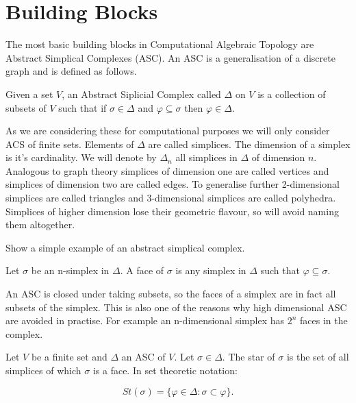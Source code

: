 \section{Building Blocks}

The most basic building blocks in Computational Algebraic Topology are Abstract Simplical Complexes (ASC). An ASC is a generalisation of a discrete graph and is defined as follows.


\begin{defn} Given a set $V$, an Abstract Siplicial Complex called $\Delta$ on $V$ is a collection of subsets of $V$ such that if $\sigma \in \Delta$ and $\varphi \subseteq \sigma$ then $\varphi \in \Delta$.  \end{defn}

As we are considering these for computational purposes we will only consider ACS of finite sets. Elements of $\Delta$ are called simplices. The dimension of a simplex is it's cardinality. We will denote by $\Delta_n$ all simplices in $\Delta$ of dimension $n$. Analogous to graph theory simplices of dimension one are called vertices and simplices of dimension two are called edges. To generalise further 2-dimensional simplices are called triangles and 3-dimensional simplices are called polyhedra. Simplices of higher dimension lose their geometric flavour, so will avoid naming them altogether.

\begin{ex} Show a simple example of an abstract simplical complex. \end{ex}


\begin{defn} Let $\sigma$ be an n-simplex in $\Delta$. A face of $\sigma$ is any simplex in $\Delta$ such that $\varphi \subseteq \sigma$. \end{defn}

An ASC is closed under taking subsets, so the faces of a simplex are in fact all subsets of the simplex. This is also one of the reasons why high dimensional ASC are avoided in practise. For example an n-dimensional simplex has $2^n$ faces in the complex.

\begin{defn} Let $V$ be a finite set and $\Delta$ an ASC of $V$. Let $\sigma \in \Delta$. The star of $\sigma$ is the set of all simplices of which $\sigma$ is a face. In set theoretic notation:\end{defn}

$$ St(\sigma) =  \{ \varphi \in \Delta : \sigma \subset \varphi \}. $$

